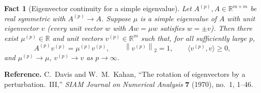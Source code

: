 \documentclass[11pt]{article}
\newtheorem{fact}{Fact}
\newcommand{\R}{\mathbb{R}}
\newcommand{\norm}[1]{\left\lVert #1 \right\rVert}
\newcommand{\inner}[2]{\langle #1, #2 \rangle}
\begin{document}
\bigskip

\begin{fact}[Eigenvector continuity for a simple eigenvalue]
\label{Fact3}
Let $A^{(p)}, A \in \R^{m\times m}$ be real symmetric with $A^{(p)}\to A$.
Suppose $\mu$ is a \emph{simple} eigenvalue of $A$ with unit eigenvector $v$
(every unit vector $w$ with $Aw=\mu w$ satisfies $w=\pm v$). Then there exist
$\mu^{(p)}\in\R$ and unit vectors $v^{(p)}\in\R^{m}$ such that, for all
sufficiently large $p$,
\[
  A^{(p)} v^{(p)} = \mu^{(p)} v^{(p)},
  \qquad \norm{v^{(p)}}_2 = 1,
  \qquad \inner{v^{(p)}}{v} \ge 0,
\]
and $\mu^{(p)}\to\mu$, $v^{(p)}\to v$ as $p\to\infty$.
\end{fact}


\medskip
\noindent\textbf{Reference.} C.~Davis and W.~M.~Kahan, ``The rotation of
eigenvectors by a perturbation.~III,'' \emph{SIAM Journal on Numerical
Analysis} \textbf{7} (1970), no.~1, 1--46.
\end{document}
